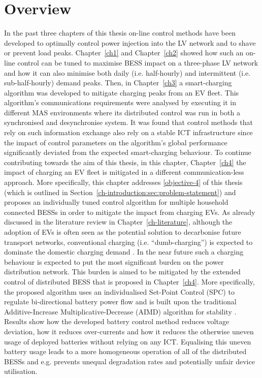 \section{Overview}
\label{ch4:sec:overview}

In the past three chapters of this thesis on-line control methods have been developed to optimally control power injection into the LV network and to shave or prevent load peaks.
Chapter~\ref{ch1} and Chapter~\ref{ch2} showed how such an on-line control can be tuned to maximise BESS impact on a three-phase LV network and how it can also minimise both daily (i.e. half-hourly) and intermittent (i.e. sub-half-hourly) demand peaks.
Then, in Chapter~\ref{ch3} a smart-charging algorithm was developed to mitigate charging peaks from an EV fleet.
This algorithm's communications requirements were analysed by executing it in different MAS environments where its distributed control was run in both a synchronised and desynchronise system.
It was found that control methods that rely on such information exchange also rely on a stable ICT infrastructure since the impact of control parameters on the algorithm's global performance significantly deviated from the expected smart-charging behaviour.
To continue contributing towards the aim of this thesis, in this chapter, Chapter~\ref{ch4} the impact of charging an EV fleet is mitigated in a different communication-less approach.
More specifically, this chapter addresses \ref{objective-4} of this thesis (which is outlined in Section~\ref{ch-introduction:sec:problem-statement}) and proposes an individually tuned control algorithm for multiple household connected BESSs in order to mitigate the impact from charging EVs.
As already discussed in the literature review in Chapter~\ref{ch-literature}, although the adoption of EVs is often seen as the potential solution to decarbonise future transport networks, conventional charging (i.e. ``dumb-charging'') is expected to dominate the domestic charging demand \cite{Shah2015}.
In the near future such a charging behaviour is expected to put the most significant burden on the power distribution network.
This burden is aimed to be mitigated by the extended control of distributed BESS that is proposed in Chapter~\ref{ch4}.
More specifically, the proposed algorithm uses an individualised Set-Point Control (SPC) to regulate bi-directional battery power flow and is built upon the traditional Additive-Increase Multiplicative-Decrease (AIMD) algorithm for stability \cite{Chiu1989}.
Results show how the developed battery control method reduces voltage deviation, how it reduces over-currents and how it reduces the otherwise uneven usage of deployed batteries without relying on any ICT.
Equalising this uneven battery usage leads to a more homogeneous operation of all of the distributed BESSs and e.g. prevents unequal degradation rates and potentially unfair device utilisation.

